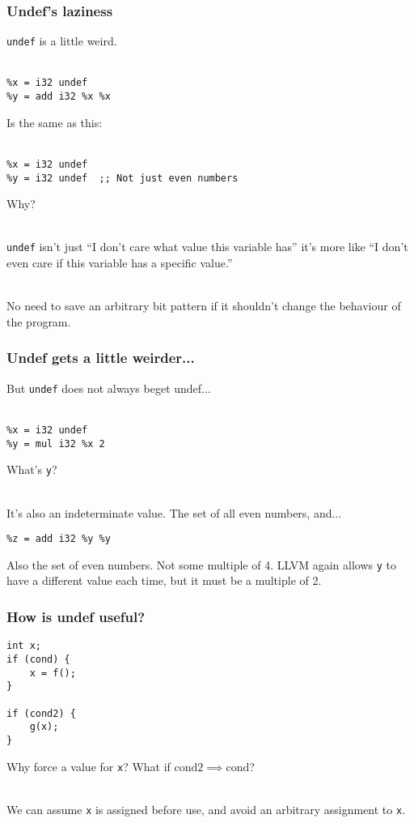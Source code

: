 \documentclass[handout]{beamer}
\begin{document}
  \begin{frame}[fragile]
    \frametitle{Undef's laziness}

    {\tt undef} is a little weird.\\~

\begin{lstlisting}
%x = i32 undef
%y = add i32 %x %x
\end{lstlisting}

    Is the same as this:\\~

\begin{lstlisting}
%x = i32 undef
%y = i32 undef  ;; Not just even numbers
\end{lstlisting}

    Why?\\~

    \pause

    {\tt undef} isn't just ``I don't care what value this
    variable has'' it's more like ``I don't even care if this variable
    has a specific value.''\\~

    No need to save an arbitrary bit pattern if it shouldn't change
    the behaviour of the program.
  \end{frame}

  \begin{frame}[fragile]
    \frametitle{Undef gets a little weirder...}

    But \texttt{undef} does not always beget undef...\\~

\begin{lstlisting}
%x = i32 undef
%y = mul i32 %x 2
\end{lstlisting}

    What's {\tt y}? \\~

    \pause

    It's also an indeterminate value. The set of all even numbers,
    and...

\begin{lstlisting}
%z = add i32 %y %y
\end{lstlisting}

    \pause

    Also the set of even numbers. Not some multiple of 4. LLVM again allows
    {\tt y} to have a different value each time, but it must be a
    multiple of 2.
  \end{frame}

\begin{frame}[fragile]
  \frametitle{How is undef useful?}

\begin{lstlisting}
int x;
if (cond) {
    x = f();
}

if (cond2) {
    g(x);
}
\end{lstlisting}

  Why force a value for {\tt x}? What if $\mathrm{cond2}
  \implies \mathrm{cond}$?\\~

  We can assume {\tt x} is assigned before use, and avoid an arbitrary
  assignment to {\tt x}.

\end{frame}
\end{document}
